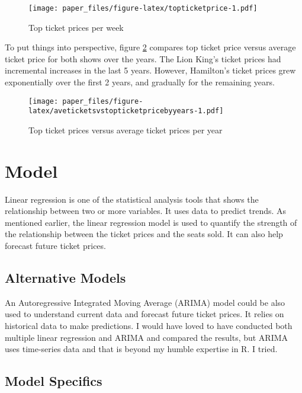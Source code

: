 \documentclass[
]{article}
\begin{document}
\begin{figure}
\centering
\texttt{[image: paper\_files/figure-latex/topticketprice-1.pdf]}
\caption{\label{fig:topticketprice}Top ticket prices per week}
\end{figure}

\newpage

To put things into perspective, figure \ref{fig:aveticketsvstopticketpricebyyears} compares top ticket price versus average ticket price for both shows over the years. The Lion King's ticket prices had incremental increases in the last 5 years. However, Hamilton's ticket prices grew exponentially over the first 2 years, and gradually for the remaining years.

\begin{figure}
\centering
\texttt{[image: paper\_files/figure-latex/aveticketsvstopticketpricebyyears-1.pdf]}
\caption{\label{fig:aveticketsvstopticketpricebyyears}Top ticket prices versus average ticket prices per year}
\end{figure}

\newpage

\hypertarget{model}{%
\section{Model}\label{model}}

Linear regression is one of the statistical analysis tools that shows the relationship between two or more variables. It uses data to predict trends. As mentioned earlier, the linear regression model is used to quantify the strength of the relationship between the ticket prices and the seats sold. It can also help forecast future ticket prices.

\hypertarget{alternative-models}{%
\subsection{Alternative Models}\label{alternative-models}}

An Autoregressive Integrated Moving Average (ARIMA) model could be also used to understand current data and forecast future ticket prices. It relies on historical data to make predictions. I would have loved to have conducted both multiple linear regression and ARIMA and compared the results, but ARIMA uses time-series data and that is beyond my humble expertise in R. I tried.

\hypertarget{model-specifics}{%
\subsection{Model Specifics}\label{model-specifics}}
\end{document}
